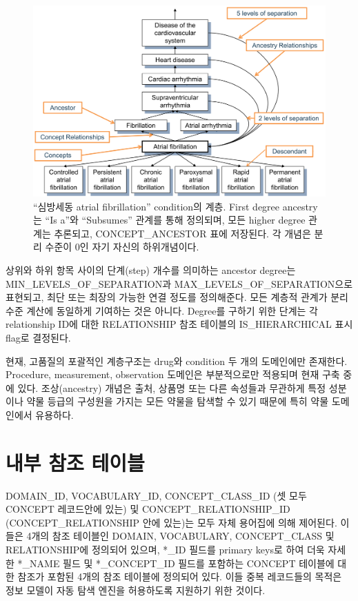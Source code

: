 \documentclass[11pt]{book}
\theoremstyle{definition}
\theoremstyle{definition}
\theoremstyle{definition}
\theoremstyle{remark}
\begin{document}
\begin{figure}

{\centering \includegraphics[width=1\linewidth]{images/StandardizedVocabularies/conceptAncestor} 

}

\caption{``심방세동 atrial fibrillation'' condition의 계층. First
degree ancestry는 ``Is a''와 ``Subsumes'' 관계를 통해 정의되며, 모든
higher degree 관계는 추론되고, CONCEPT\_ANCESTOR 표에 저장된다. 각
개념은 분리 수준이 0인 자기 자신의 하위개념이다.
}\label{fig:conceptAncestor}
\end{figure}

상위와 하위 항목 사이의 단계(step) 개수를 의미하는 ancestor degree는
MIN\_LEVELS\_OF\_SEPARATION과 MAX\_LEVELS\_OF\_SEPARATION으로 표현되고,
최단 또는 최장의 가능한 연결 정도를 정의해준다. 모든 계층적 관계가 분리
수준 계산에 동일하게 기여하는 것은 아니다. Degree를 구하기 위한 단계는
각 relationship ID에 대한 RELATIONSHIP 참조 테이블의 IS\_HIERARCHICAL
표시 flag로 결정된다.

현재, 고품질의 포괄적인 계층구조는 drug와 condition 두 개의 도메인에만
존재한다. Procedure, measurement, observation 도메인은 부분적으로만
적용되며 현재 구축 중에 있다. 조상(ancestry) 개념은 출처, 상품명 또는
다른 속성들과 무관하게 특정 성분이나 약물 등급의 구성원을 가지는 모든
약물을 탐색할 수 있기 때문에 특히 약물 도메인에서 유용하다.

\section{내부 참조 테이블}\label{--}

DOMAIN\_ID, VOCABULARY\_ID, CONCEPT\_CLASS\_ID (셋 모두 CONCEPT
레코드안에 있는) 및 CONCEPT\_RELATIONSHIP\_ID (CONCEPT\_RELATIONSHIP
안에 있는)는 모두 자체 용어집에 의해 제어된다. 이들은 4개의 참조
테이블인 DOMAIN, VOCABULARY, CONCEPT\_CLASS 및 RELATIONSHIP에 정의되어
있으며, *\_ID 필드를 primary keys로 하여 더욱 자세한 *\_NAME 필드 및
*\_CONCEPT\_ID 필드를 포함하는 CONCEPT 테이블에 대한 참조가 포함된 4개의
참조 테이블에 정의되어 있다. 이들 중복 레코드들의 목적은 정보 모델이
자동 탐색 엔진을 허용하도록 지원하기 위한 것이다.
\end{document}
